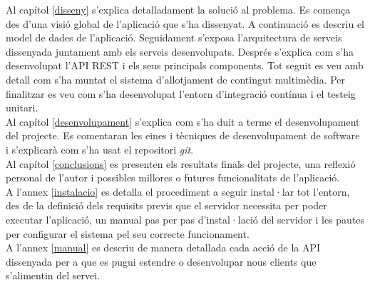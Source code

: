 Al capítol \ref{disseny} s'explica detalladament la solució al problema. Es comença des d'una visió global de l'aplicació que s'ha dissenyat. A continuació es descriu el model de dades de l'aplicació. Seguidament s'exposa l'arquitectura de serveis dissenyada juntament amb els serveis desenvolupats. Després s'explica com s'ha desenvolupat l'\ac{API} \ac{REST} i els seus principals components. Tot seguit es veu amb detall com s'ha muntat el sistema d'allotjament de contingut multimèdia. Per finalitzar es veu com s'ha desenvolupat l'entorn d'integració contínua i el testeig unitari.\\

Al capítol \ref{desenvolupament} s'explica com s'ha duit a terme el desenvolupament del projecte. Es comentaran les eines i tècniques de desenvolupament de software i s'explicarà com s'ha usat el repositori \emph{git}.\\

Al capítol \ref{conclusions} es presenten els resultats finals del projecte, una reflexió personal de l'autor i possibles millores o futures funcionalitats de l'aplicació. \\

A l'annex \ref{instalacio} es detalla el procediment a seguir instal·lar tot l'entorn, des de la definició dels requisits previs que el servidor necessita per poder executar l'aplicació, un manual pas per pas d'instal·lació del servidor i les pautes per configurar el sistema pel seu correcte funcionament.\\

A l'annex \ref{manual} es descriu de manera detallada cada acció de la API dissenyada per a que es pugui estendre o desenvolupar nous clients que s'alimentin del servei. \\

